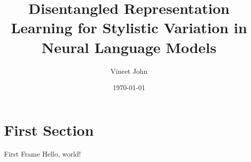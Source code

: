 \documentclass{beamer}
\title{Disentangled Representation Learning for Stylistic Variation in Neural Language Models}
\date{\today}
\author{Vineet John}
\institute{University of Waterloo}
\begin{document}
\maketitle
\section{First Section}
\begin{frame}{First Frame}
	Hello, world!
\end{frame}
\end{document}
